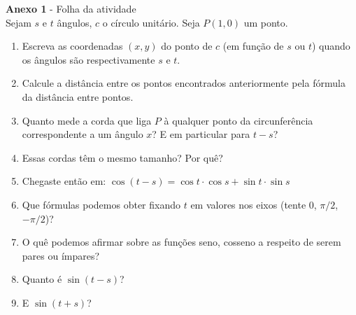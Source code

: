 \documentclass[english,ngerman,parskip=half]{scrartcl}
\begin{document}
\textbf{Anexo 1} - Folha da atividade \\
Sejam $s$ e $t$ ângulos, $c$ o círculo unitário. Seja $P(1,0)$ um ponto. 
\begin{enumerate}
    \item Escreva as coordenadas $(x,y)$ do ponto de $c$ (em função de $s$ ou $t$) quando os ângulos são respectivamente $s$ e $t$.
    \item Calcule a distância entre os pontos encontrados anteriormente pela fórmula da distância entre pontos.
    \item Quanto mede a corda que liga $P$ à qualquer ponto da circunferência correspondente a um ângulo $x$? E em particular para $t-s$?
    \item Essas cordas têm o mesmo tamanho? Por quê?
    \item Chegaste então em: $\cos (t-s) = \cos t \cdot \cos s + \sin t \cdot \sin s$
    \item Que fórmulas podemos obter fixando $t$ em valores nos eixos (tente $0$, $\pi/2$, $-\pi/2$)?
    \item O quê podemos afirmar sobre as funções seno, cosseno a respeito de serem pares ou ímpares?
    \item Quanto é $\sin(t-s)$?
    \item E $\sin(t+s)$? 
\end{enumerate}
\end{document}
